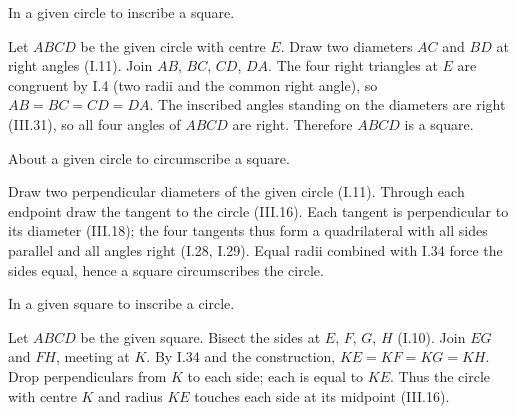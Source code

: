 \begin{claim}
\label{prop:IV.6}
In a given circle to inscribe a square.
\end{claim}
\begin{evidence}[Proof of IV.6]
\label{ev:IV.6}
Let $ABCD$ be the given circle with centre $E$.  Draw two diameters
$AC$ and $BD$ at right angles (I.11).  Join $AB$, $BC$, $CD$, $DA$.
The four right triangles at $E$ are congruent by I.4 (two radii and
the common right angle), so $AB = BC = CD = DA$.  The inscribed
angles standing on the diameters are right (III.31), so all four
angles of $ABCD$ are right.  Therefore $ABCD$ is a square.
\end{evidence}

\begin{claim}
\label{prop:IV.7}
About a given circle to circumscribe a square.
\end{claim}
\begin{evidence}[Proof of IV.7]
\label{ev:IV.7}
Draw two perpendicular diameters of the given circle (I.11).  Through
each endpoint draw the tangent to the circle (III.16).  Each tangent
is perpendicular to its diameter (III.18); the four tangents thus form
a quadrilateral with all sides parallel and all angles right (I.28,
I.29).  Equal radii combined with I.34 force the sides equal, hence a
square circumscribes the circle.
\end{evidence}

\begin{claim}
\label{prop:IV.8}
In a given square to inscribe a circle.
\end{claim}
\begin{evidence}[Proof of IV.8]
\label{ev:IV.8}
Let $ABCD$ be the given square.  Bisect the sides at $E$, $F$, $G$,
$H$ (I.10).  Join $EG$ and $FH$, meeting at $K$.  By I.34 and the
construction, $KE = KF = KG = KH$.  Drop perpendiculars from $K$ to
each side; each is equal to $KE$.  Thus the circle with centre $K$
and radius $KE$ touches each side at its midpoint (III.16).
\end{evidence}

